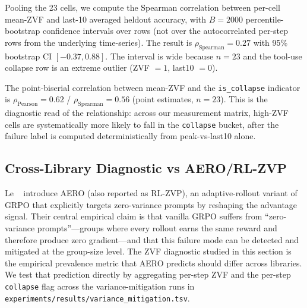 Pooling the 23 cells, we compute the Spearman correlation between
per-cell mean-ZVF and last-10 averaged heldout accuracy, with
$B=2000$ percentile-bootstrap confidence intervals over rows (not
over the autocorrelated per-step rows from the underlying
time-series). The result is
$\rho_{\mathrm{Spearman}} = 0.27$ with 95\% bootstrap CI
$[-0.37, 0.88]$. The interval is wide because $n=23$ and the
tool-use collapse row is an extreme outlier (ZVF $= 1$, last10 $= 0$).

The point-biserial correlation between mean-ZVF and the
\texttt{is\_collapse} indicator is
$\rho_{\mathrm{Pearson}} = 0.62$ / $\rho_{\mathrm{Spearman}}
= 0.56$ (point estimates, $n=23$). This is the diagnostic
read of the relationship: across our measurement matrix,
high-ZVF cells are systematically more likely to fall in the
\texttt{collapse} bucket, after the failure label is computed
deterministically from peak-vs-last10 alone.

\subsection{Cross-Library Diagnostic vs AERO/RL-ZVP}
\label{sec:zvf-cross-experiment:aero}

Le \etal~\cite{le2025rlzvp} introduce AERO (also reported as
RL-ZVP), an adaptive-rollout variant of GRPO that explicitly
targets zero-variance prompts by reshaping the advantage signal.
Their central empirical claim is that vanilla GRPO suffers from
``zero-variance prompts''---groups where every rollout earns the
same reward and therefore produce zero gradient---and that this
failure mode can be detected and mitigated at the group-size
level. The ZVF diagnostic studied in this section is the
empirical prevalence metric that AERO predicts should differ
across libraries. We test that prediction directly by aggregating
per-step ZVF and the per-step \texttt{collapse} flag across the
variance-mitigation runs in
\texttt{experiments/results/variance\_mitigation.tsv}.

